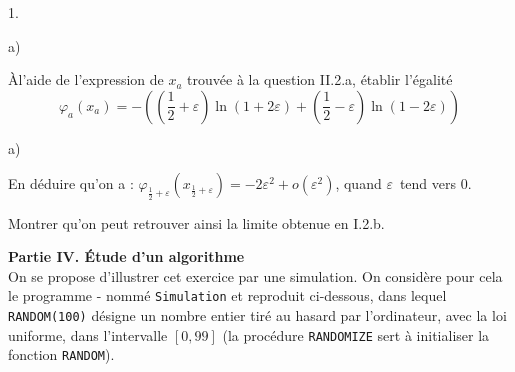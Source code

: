 \documentclass[11pt]{article}%
\begin{document}
\begin{noliste}{1.}
\begin{noliste}{a)}
\item {\`{A}l'aide de l'expression de $x_{a}$ trouvée à la question
II.2.a, 
établir l'égalité 
\[
\varphi_{a}(x_{a}) = -\left( (\frac{1}{2} + \varepsilon )\ln (1 +
2\varepsilon ) + (\frac{1}{2}-\varepsilon )\ln (1-2\varepsilon )\right)

\]
}
\end{noliste}

\item 
\begin{noliste}{a)}
 \setlength{\itemsep}{2mm}
\item {En déduire qu'on a : $\varphi_{\frac{1}{2} + \varepsilon
}(x_{\frac{1}{2} + \varepsilon }) = -2\varepsilon ^{2} + o(\varepsilon
^{2})$, quand }$\varepsilon ${\ tend vers 0. }

\item {Montrer qu'on peut retrouver ainsi la limite obtenue en I.2.b. }
\end{noliste}
\end{noliste}

\textbf{Partie IV. Étude d'un algorithme}\\
On se propose d'illustrer cet exercice par une simulation. On considère
pour
cela le programme -\Scilab{} nommé \texttt{Simulation} et reproduit
ci-dessous, dans lequel \texttt{RANDOM(100)} désigne un nombre entier
tiré
au hasard par l'ordinateur, avec la loi uniforme, dans l'intervalle
$[0,99]$
(la procédure \texttt{RANDOMIZE} sert à initialiser la fonction
\texttt{RANDOM}).
\end{document}

